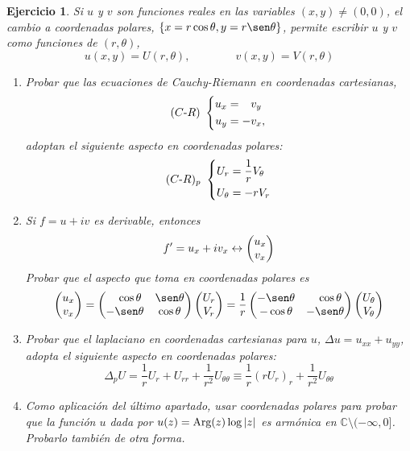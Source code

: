 \documentclass[11pt]{report}
\newcommand{\C}{\mathbb C}
\newtheorem{exercise}{Ejercicio}
\theoremstyle{remark}
\begin{document}
\begin{exercise}
Si $u$ y $v$ son funciones reales en las variables $(x,y) \neq (0,0)$, el cambio a coordenadas polares, $\{x = r\cos\theta, y = r\sen\theta\}$, permite escribir $u$ y $v$ como funciones de $(r,\theta)$,
\[u(x,y)=U(r,\theta), \qquad \qquad v(x,y)=V(r,\theta)\]
\begin{enumerate}
    \item Probar que las ecuaciones de Cauchy-Riemann en coordenadas cartesianas,
    \[(C\textup{-}R) \ \left\{\begin{alignedat}{1}
        u_x &= \phantom{-}v_y \\
        u_y &= -v_x,
    \end{alignedat}\right.\]
    adoptan el siguiente aspecto en coordenadas polares:
    \[(C\textup{-}R)_p \ \left\{\begin{alignedat}{1}
        U_r &=\frac{1}{r}V_\theta \\
        U_\theta &= -rV_r
    \end{alignedat}\right.\]
    \item Si $f = u+iv$ es derivable, entonces \[f' = u_x+iv_x \leftrightarrow \left(\begin{array}{@{}c@{}}
        u_x \\
        v_x
    \end{array}\right)\] Probar que el aspecto que toma en coordenadas polares es
    \[\left(\begin{array}{@{}c@{}}
        u_x \\
        v_x 
    \end{array}\right) = \left(\begin{array}{@{}cc@{}}
        \phantom{-}\cos\theta & \sen\theta \\
        -\sen\theta & \cos\theta
    \end{array}\right)\left(\begin{array}{@{}c@{}}
        U_r \\
        V_r
    \end{array}\right) = \frac{1}{r} \left(\begin{array}{@{}cc@{}}
        -\sen\theta & \phantom{-}\cos\theta \\
        -\cos\theta & -\sen\theta
    \end{array}\right)\left(\begin{array}{@{}c@{}}
        U_\theta \\
        V_\theta
    \end{array}\right)\]
    \item Probar que el laplaciano en coordenadas cartesianas para $u$, $\Delta u = u_{xx}+u_{yy}$, adopta el siguiente aspecto en coordenadas polares:
    \[\Delta_pU=\frac{1}{r}U_r+U_{rr}+\frac{1}{r^2}U_{\theta\theta} \equiv \frac{1}{r}(rU_r)_r+\frac{1}{r^2}U_{\theta\theta}\]
    \item Como aplicación del último apartado, usar coordenadas polares para probar que la función $u$ dada por $u(z) = \textup{Arg}(z)\log|z|$ es armónica en $\C\setminus(-\infty,0]$. Probarlo también de otra forma.
\end{enumerate}
\end{exercise}
\end{document}
